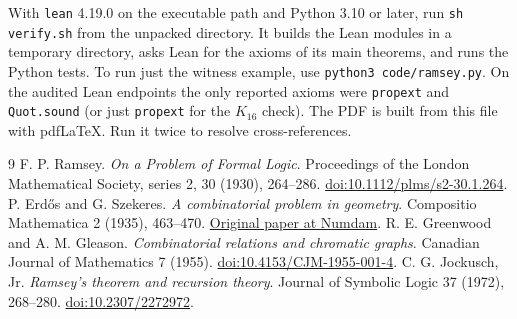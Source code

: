 \documentclass[11pt,letterpaper]{article}
\newcommand{\code}[1]{\texttt{#1}}
\newcommand{\point}[1]{\par\smallskip{\bfseries\color{ink}#1.}\enspace}
\begin{document}
\point{Running the checks} With \code{lean} 4.19.0 on the executable path and Python 3.10 or later, run \code{sh verify.sh} from the unpacked directory. It builds the Lean modules in a temporary directory, asks Lean for the axioms of its main theorems, and runs the Python tests. To run just the witness example, use \code{python3 code/ramsey.py}. On the audited Lean endpoints the only reported axioms were \code{propext} and \code{Quot.sound} (or just \code{propext} for the $K_{16}$ check). The PDF is built from this file with pdfLaTeX. Run it twice to resolve cross-references.

\begin{thebibliography}{9}\setlength{\itemsep}{4pt}
 F. P. Ramsey.
\emph{On a Problem of Formal Logic}. Proceedings of the London Mathematical Society, series 2, 30 (1930), 264--286.
\href{https://doi.org/10.1112/plms/s2-30.1.264}{doi:10.1112/plms/s2-30.1.264}.
 P. Erd\H{o}s and G. Szekeres.
\emph{A combinatorial problem in geometry}. Compositio Mathematica 2 (1935), 463--470.
\href{https://www.numdam.org/item/CM_1935__2__463_0/}{Original paper at Numdam}.
 R. E. Greenwood and A. M. Gleason.
\emph{Combinatorial relations and chromatic graphs}. Canadian Journal of Mathematics 7 (1955).
\href{https://doi.org/10.4153/CJM-1955-001-4}{doi:10.4153/CJM-1955-001-4}.
 C. G. Jockusch, Jr.
\emph{Ramsey's theorem and recursion theory}. Journal of Symbolic Logic 37 (1972), 268--280.
\href{https://doi.org/10.2307/2272972}{doi:10.2307/2272972}.
\end{thebibliography}
\end{document}
